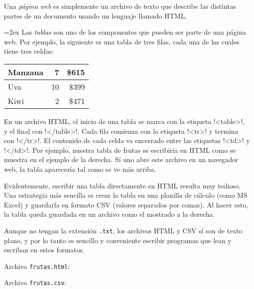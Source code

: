 Una \emph{página web}
es simplemente un archivo de texto
que describe las distintas partes de un documento
usando un lenguaje llamado HTML.

\begin{minipage}[t]{0.7\textwidth}
  \parskip=2ex
  Las \emph{tablas} son uno de los componentes
  que pueden ser parte de una página web.
  Por ejemplo,
  la siguiente es una tabla de tres filas,
  cada una de las cuales tiene tres celdas:

  \hfil
  \begin{tabular}{|l|r|r|}  \hline
    Manzana &  7 & \$615 \\ \hline
    Uva     & 10 & \$399 \\ \hline
    Kiwi    &  2 & \$471 \\ \hline
  \end{tabular}
  \hfill

  \newcommand\lh{\li[language=html]}
  En un archivo HTML,
  el inicio de una tabla se marca con la etiqueta \lh!<table>!,
  y el final con \lh!</table>!.
  Cada fila comienza con la etiqueta \lh!<tr>!
  y termina con \lh!</tr>!.
  El contenido de cada celda va encerrado entre las etiquetas
  \lh!<td>! y \lh!</td>!.
  Por ejemplo,
  nuestra tabla de frutas se escribiría en HTML
  como se muestra en el ejemplo de la derecha.
  Si uno abre este archivo en un navegador web,
  la tabla aparecería tal como se ve más arriba.

  Evidentemente,
  escribir una tabla directamente en HTML resulta muy tedioso.
  Una estrategia más sencilla es crear la tabla en una planilla de cálculo
  (como MS Excel)
  y guardarla en formato CSV (valores separados por comas).
  Al hacer esto,
  la tabla queda guardada en un archivo como el mostrado a la derecha.

  Aunque no tengan la extensión \verb!.txt!,
  los archivos HTML y CSV sí son de texto plano,
  y por lo tanto es sencillo y conveniente escribir programas
  que lean y escriban en estos formatos.
\end{minipage}
\hfill
\begin{minipage}[t]{0.25\textwidth}
  Archivo \verb+frutas.html+:
  

  Archivo \verb+frutas.csv+:
  
\end{minipage}


